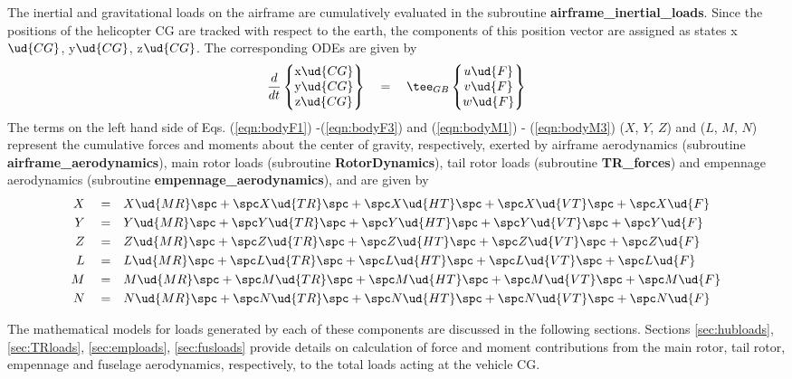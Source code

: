 The inertial and gravitational loads on the airframe are cumulatively evaluated in the subroutine \textbf{airframe\_inertial\_loads}. Since the positions of the helicopter CG are tracked with respect to the earth, the components of this position vector are assigned as states x$\ud{CG}$, y$\ud{CG}$, z$\ud{CG}$. The corresponding ODEs are given by 
\begin{equation}
\label{eqn:cgmotion}
\frac{d}{dt} \begin{Bmatrix} \textrm{x}\ud{CG} \\ \textrm{y}\ud{CG} \\ \textrm{z}\ud{CG} \end{Bmatrix} \quad = \quad \tee_{GB} \begin{Bmatrix} u\ud{F} \\ v\ud{F} \\ w\ud{F} \end{Bmatrix}
\end{equation}
The terms on the left hand side of Eqs. (\ref{eqn:bodyF1}) -(\ref{eqn:bodyF3}) and (\ref{eqn:bodyM1}) - (\ref{eqn:bodyM3}) ($X$, $Y$, $Z$) and ($L$, $M$, $N$) represent the cumulative forces and moments about the center of gravity, respectively, exerted by airframe aerodynamics (subroutine \textbf{airframe\_aerodynamics}), main rotor loads (subroutine \textbf{RotorDynamics}), tail rotor loads (subroutine \textbf{TR\_forces}) and empennage aerodynamics (subroutine \textbf{empennage\_aerodynamics}), and are given by 
\begin{align*}
X \quad = \quad &X\ud{MR} \spc + \spc X\ud{TR} \spc + \spc X\ud{HT} \spc + \spc X\ud{VT} \spc + \spc X\ud{F} \\
Y \quad = \quad &Y\ud{MR} \spc + \spc Y\ud{TR} \spc + \spc Y\ud{HT} \spc + \spc Y\ud{VT} \spc + \spc Y\ud{F} \\
Z \quad = \quad &Z\ud{MR} \spc + \spc Z\ud{TR} \spc + \spc Z\ud{HT} \spc + \spc Z\ud{VT} \spc + \spc Z\ud{F} \\
L \quad = \quad &L\ud{MR} \spc + \spc L\ud{TR} \spc + \spc L\ud{HT} \spc + \spc L\ud{VT} \spc + \spc L\ud{F} \\
M \quad = \quad &M\ud{MR} \spc + \spc M\ud{TR} \spc + \spc M\ud{HT} \spc + \spc M\ud{VT} \spc + \spc M\ud{F} \\
N \quad = \quad &N\ud{MR} \spc + \spc N\ud{TR} \spc + \spc N\ud{HT} \spc + \spc N\ud{VT} \spc + \spc N\ud{F}
\end{align*}

The mathematical models for loads generated by each of these components are discussed in the following sections. Sections \ref{sec:hubloads}, \ref{sec:TRloads}, \ref{sec:emploads}, \ref{sec:fusloads} provide details on calculation of force and moment contributions from the main rotor, tail rotor, empennage and fuselage aerodynamics, respectively, to the total loads acting at the vehicle CG. 

